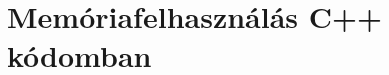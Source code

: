 \documentclass[11pt,a4paper,oneside]{report}
\begin{document}
\section{Memóriafelhasználás C++ kódomban}

% 
% 
% 



\nocite{*}



\end{document}

